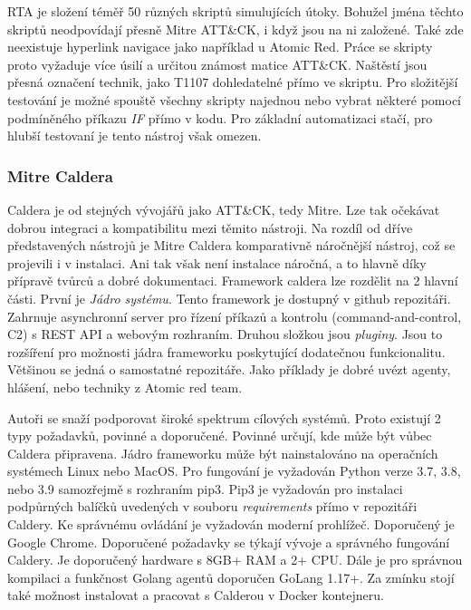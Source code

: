 \ac{RTA} je složení téměř 50 různých skriptů simulujících útoky.
Bohužel jména těchto skriptů neodpovídají přesně Mitre ATT\&CK, i když jsou na ni založené.
Také zde neexistuje hyperlink navigace jako například u Atomic Red.
Práce se skripty proto vyžaduje více úsilí a určitou známost matice ATT\&CK\@.
Naštěstí jsou přesná označení technik, jako T1107 dohledatelné přímo ve skriptu.
Pro složitější testování je možné spouště všechny skripty najednou nebo vybrat některé pomocí podmíněného příkazu \textit{IF} přímo v kodu.
Pro základní automatizaci stačí, pro hlubší testovaní je tento nástroj však omezen.\cite{csoonline_4_testing_frameworks}


\subsubsection{Mitre Caldera}
Caldera je od stejných vývojářů jako ATT\&CK, tedy Mitre.
Lze tak očekávat dobrou integraci a kompatibilitu mezi těmito nástroji.
Na rozdíl od dříve představených nástrojů je Mitre Caldera komparativně náročnější nástroj, což se projevili i v instalaci.
Ani tak však není instalace náročná, a to hlavně díky přípravě tvůrců a dobré dokumentaci\cite{mitre_caldera_docs}.
Framework caldera lze rozdělit na 2 hlavní části.
První je \textit{Jádro systému}.
Tento framework je dostupný v github repozitáři.
Zahrnuje asynchronní server pro řízení příkazů a kontrolu (command-and-control, C2) s REST API a webovým rozhraním.
Druhou složkou jsou \textit{pluginy}.
Jsou to rozšíření pro možnosti jádra frameworku poskytující dodatečnou funkcionalitu.
Většinou se jedná o samostatné repozitáře.
Jako příklady je dobré uvézt agenty, hlášení, nebo  techniky z Atomic red team.\cite{mitre_caldera}

Autoři se snaží podporovat široké spektrum cílových systémů.
Proto existují 2 typy požadavků, povinné a doporučené.
Povinné určují, kde může být vůbec Caldera připravena.
Jádro frameworku může být nainstalováno na operačních systémech Linux nebo MacOS\@.
Pro fungování je vyžadován Python verze 3.7, 3.8, nebo 3.9 samozřejmě s rozhraním pip3.
Pip3 je vyžadován pro instalaci podpůrných balíčků uvedených v souboru \textit{requirements} přímo v repozitáři Caldery.
Ke správnému ovládání je vyžadován moderní prohlížeč.
Doporučený je Google Chrome.
Doporučené požadavky se týkají vývoje a správného fungování Caldery.
Je doporučený hardware s 8GB+ RAM a 2+ CPU\@.
Dále je pro správnou kompilaci a funkčnost Golang agentů doporučen GoLang 1.17+.
Za zmínku stojí také možnost instalovat a pracovat s Calderou v Docker kontejneru.\cite{mitre_caldera_docs}

